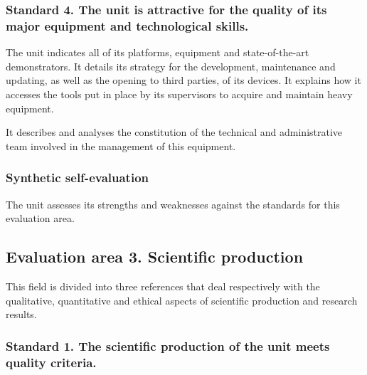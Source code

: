 \subsubsection*{Standard 4. The unit is attractive for the quality of its major
equipment and technological skills.}

\begin{hceresinstructions}
  The unit indicates all of its platforms, equipment and state-of-the-art
  demonstrators. It details its strategy for the development, maintenance
  and updating, as well as the opening to third parties, of its devices.
  It explains how it accesses the tools put in place by its supervisors to
  acquire and maintain heavy equipment.

  It describes and analyses the constitution of the technical and
  administrative team involved in the management of this equipment.
\end{hceresinstructions}

\subsubsection*{Synthetic self-evaluation}

\begin{hceresinstructions}
  The unit assesses its strengths and weaknesses against the standards for
  this evaluation area.
\end{hceresinstructions}

\subsection*{Evaluation area 3. Scientific production}

\begin{hceresinstructions}
  This field is divided into three references that deal respectively with
  the qualitative, quantitative and ethical aspects of scientific
  production and research results.
\end{hceresinstructions}

\subsubsection*{Standard 1. The scientific production of the unit meets quality
criteria.}

